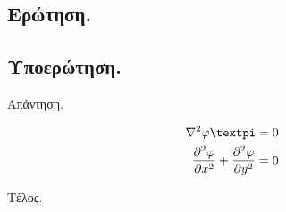 \documentclass[10pt,landscape]{article}
\providecommand*{\pd}[3][]{\frac{\partial^{#1}#2}{\partial #3^{#1}}}
\begin{document}
\begin{multicols}{3}

\section{Ερώτηση.}

\subsection{Υποερώτηση.}

Απάντηση.

\begin{align*}
    \displaystyle %
    \nabla^2\varphi \textpi                 &= 0 \\
    \pd[2]{\varphi}{x} + \pd[2]{\varphi}{y} &= 0
\end{align*}

Τέλος.












\end{multicols}
\end{document}
